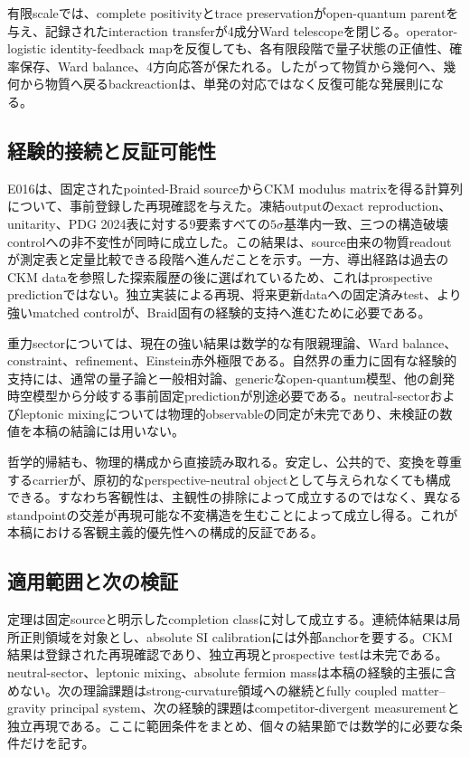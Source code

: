 \documentclass[11pt]{article}
\theoremstyle{definition}
\theoremstyle{remark}
\begin{document}
有限scaleでは、complete positivityとtrace preservationがopen-quantum parentを与え、記録されたinteraction transferが4成分Ward telescopeを閉じる。operator-logistic identity-feedback mapを反復しても、各有限段階で量子状態の正値性、確率保存、Ward balance、4方向応答が保たれる。したがって物質から幾何へ、幾何から物質へ戻るbackreactionは、単発の対応ではなく反復可能な発展則になる。

\subsection{経験的接続と反証可能性}

E016は、固定されたpointed-Braid sourceからCKM modulus matrixを得る計算列について、事前登録した再現確認を与えた。凍結outputのexact reproduction、unitarity、PDG 2024表に対する9要素すべての$5\sigma$基準内一致、三つの構造破壊controlへの非不変性が同時に成立した。この結果は、source由来の物質readoutが測定表と定量比較できる段階へ進んだことを示す。一方、導出経路は過去のCKM dataを参照した探索履歴の後に選ばれているため、これはprospective predictionではない。独立実装による再現、将来更新dataへの固定済みtest、より強いmatched controlが、Braid固有の経験的支持へ進むために必要である。

重力sectorについては、現在の強い結果は数学的な有限親理論、Ward balance、constraint、refinement、Einstein赤外極限である。自然界の重力に固有な経験的支持には、通常の量子論と一般相対論、genericなopen-quantum模型、他の創発時空模型から分岐する事前固定predictionが別途必要である。neutral-sectorおよびleptonic mixingについては物理的observableの同定が未完であり、未検証の数値を本稿の結論には用いない。

哲学的帰結も、物理的構成から直接読み取れる。安定し、公共的で、変換を尊重するcarrierが、原初的なperspective-neutral objectとして与えられなくても構成できる。すなわち客観性は、主観性の排除によって成立するのではなく、異なるstandpointの交差が再現可能な不変構造を生むことによって成立し得る。これが本稿における客観主義的優先性への構成的反証である。

\subsection{適用範囲と次の検証}

定理は固定sourceと明示したcompletion classに対して成立する。連続体結果は局所正則領域を対象とし、absolute SI calibrationには外部anchorを要する。CKM結果は登録された再現確認であり、独立再現とprospective testは未完である。neutral-sector、leptonic mixing、absolute fermion massは本稿の経験的主張に含めない。次の理論課題はstrong-curvature領域への継続とfully coupled matter--gravity principal system、次の経験的課題はcompetitor-divergent measurementと独立再現である。ここに範囲条件をまとめ、個々の結果節では数学的に必要な条件だけを記す。
\end{document}
